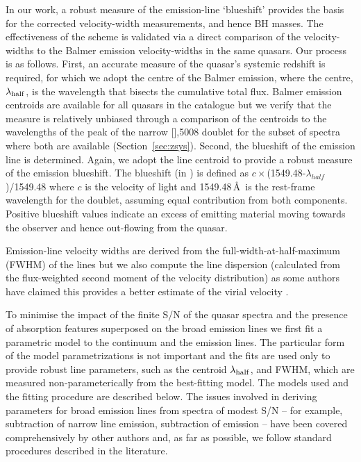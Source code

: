 In our work, a robust measure of the  emission-line `blueshift' provides the basis for the corrected  velocity-width measurements, and hence BH masses.
The effectiveness of the scheme is validated via a direct comparison of the  velocity-widths to the Balmer emission velocity-widths in the same quasars. 
Our process is as follows. 
First, an accurate measure of the quasar's systemic redshift is required, for which we adopt the centre of the Balmer emission, where the centre, $\lambda_{\rm half}$, is the wavelength that bisects the cumulative total flux. 
Balmer emission centroids are available for all quasars in the catalogue but we verify that the measure is relatively unbiased through a comparison of the centroids to the wavelengths of the peak of the narrow [],5008 doublet for the subset of spectra where both are available (Section~\ref{sec:zsys}). 
Second, the blueshift of the  emission line is determined. 
Again, we adopt the line centroid to provide a robust measure of the  emission blueshift.
The blueshift (in \kms) is defined as $c\times$(1549.48-$\lambda_{half}$)/1549.48 where $c$ is the velocity of light and 1549.48\,\AA \ is the rest-frame wavelength for the  doublet, assuming equal contribution from both components.
Positive blueshift values indicate an excess of emitting material moving towards the observer and hence out-flowing from the quasar. 

Emission-line velocity widths are derived from the full-width-at-half-maximum (FWHM) of the lines but we also compute the line dispersion (calculated from the flux-weighted second moment of the velocity distribution) as some authors have claimed this provides a better estimate of the virial velocity \citep{denney13}. 

To minimise the impact of the finite S/N of the quasar spectra and the presence of absorption features superposed on the broad emission lines we first fit a parametric model to the continuum and the emission lines. 
The particular form of the model parametrizations is not important and the fits are used only to provide robust line parameters, such as the centroid $\lambda_{\rm half}$, and FWHM, which are measured non-parameterically from the best-fitting model. 
The models used and the fitting procedure are described below. 
The issues involved in deriving parameters for broad emission lines from spectra of modest S/N -- for example, subtraction of narrow line emission, subtraction of  emission -- have been covered comprehensively by other authors \citep[e.g.][]{shen11,shen12,denney13,shen16a} and, as far as possible, we follow standard procedures described in the literature. 

